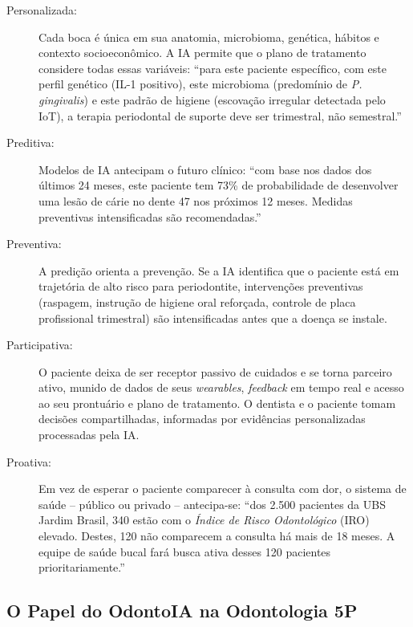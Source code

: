 \begin{description}
  \item[Personalizada:] Cada boca é única em sua anatomia, microbioma, genética,
    hábitos e contexto socioeconômico. A IA permite que o plano de tratamento
    considere todas essas variáveis: ``para este paciente específico, com este
    perfil genético (IL-1 positivo), este microbioma (predomínio de \textit{P.
    gingivalis}) e este padrão de higiene (escovação irregular detectada pelo
    IoT), a terapia periodontal de suporte deve ser trimestral, não semestral.''

  \item[Preditiva:] Modelos de IA antecipam o futuro clínico: ``com base nos
    dados dos últimos 24 meses, este paciente tem 73\% de probabilidade de
    desenvolver uma lesão de cárie no dente 47 nos próximos 12 meses. Medidas
    preventivas intensificadas são recomendadas.''

  \item[Preventiva:] A predição orienta a prevenção. Se a IA identifica que o
    paciente está em trajetória de alto risco para periodontite, intervenções
    preventivas (raspagem, instrução de higiene oral reforçada, controle de
    placa profissional trimestral) são intensificadas antes que a doença se
    instale.

  \item[Participativa:] O paciente deixa de ser receptor passivo de cuidados
    e se torna parceiro ativo, munido de dados de seus \textit{wearables},
    \textit{feedback} em tempo real e acesso ao seu prontuário e plano de
    tratamento. O dentista e o paciente tomam decisões compartilhadas,
    informadas por evidências personalizadas processadas pela IA.

  \item[Proativa:] Em vez de esperar o paciente comparecer à consulta com dor,
    o sistema de saúde -- público ou privado -- antecipa-se: ``dos 2.500
    pacientes da UBS Jardim Brasil, 340 estão com o \textit{Índice de Risco
    Odontológico} (IRO) elevado. Destes, 120 não comparecem a consulta há mais
    de 18 meses. A equipe de saúde bucal fará busca ativa desses 120 pacientes
    prioritariamente.''
\end{description}

\subsection{O Papel do OdontoIA na Odontologia 5P}

